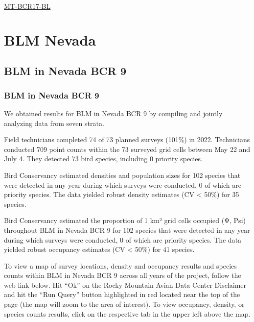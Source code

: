 \documentclass[
  letterpaper,
  DIV=11,
  numbers=noendperiod,
  oneside]{scrreprt}
\begin{document}
\href{http://www.rmbo.org/new_site/adc/QueryWindow.aspx\#N4IgzgLgTghhCuBbEAuABCAsgFQLQCEBhAJQEYB2AgGXX3igFMZ40B7AMzSpgDsATNJl4wA5g0QMeEEAF8gA}{MT-BCR17-BL}

\hypertarget{blm-nevada}{%
\section{BLM Nevada}\label{blm-nevada}}

\hypertarget{blm-in-nevada-bcr-9}{%
\subsection{BLM in Nevada BCR 9}\label{blm-in-nevada-bcr-9}}

\hypertarget{blm-in-nevada-bcr-9-1}{%
\subsubsection{BLM in Nevada BCR 9}\label{blm-in-nevada-bcr-9-1}}

We obtained results for BLM in Nevada BCR 9 by compiling and jointly
analyzing data from seven strata.

Field technicians completed 74 of 73 planned surveys (101\%) in 2022.
Technicians conducted 709 point counts within the 73 surveyed grid cells
between May 22 and July 4. They detected 73 bird species, including 0
priority species.

Bird Conservancy estimated densities and population sizes for 102
species that were detected in any year during which surveys were
conducted, 0 of which are priority species. The data yielded robust
density estimates (CV \textless{} 50\%) for 35 species.

Bird Conservancy estimated the proportion of 1 km² grid cells occupied
(Ψ, Psi) throughout BLM in Nevada BCR 9 for 102 species that were
detected in any year during which surveys were conducted, 0 of which are
priority species. The data yielded robust occupancy estimates (CV
\textless{} 50\%) for 41 species.

To view a map of survey locations, density and occupancy results and
species counts within BLM in Nevada BCR 9 across all years of the
project, follow the web link below. Hit ``Ok'' on the Rocky Mountain
Avian Data Center Disclaimer and hit the ``Run Query'' button
highlighted in red located near the top of the page (the map will zoom
to the area of interest). To view occupancy, density, or species counts
results, click on the respective tab in the upper left above the map.
\end{document}
